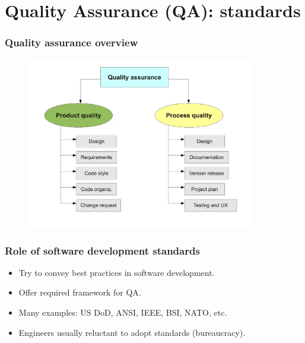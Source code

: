 \documentclass{beamer}
\begin{document}

\section{Quality Assurance (QA): standards}


\begin{frame}
\frametitle{Quality assurance overview}
\begin{center}
\begin{figure}
 \includegraphics[height=7.5cm]{figs/quality-assurance.pdf}
\end{figure}
\end{center}
\end{frame}


\begin{frame}
 \frametitle{Role of software development standards}
 \begin{itemize}
 \item Try to convey best practices in software development.
 \item Offer required framework for QA.
 \item Many examples: US DoD, ANSI, IEEE, BSI, NATO, etc.
 \item Engineers usually reluctant to adopt standards (bureaucracy).
 \end{itemize}
\end{frame}

\end{document}
